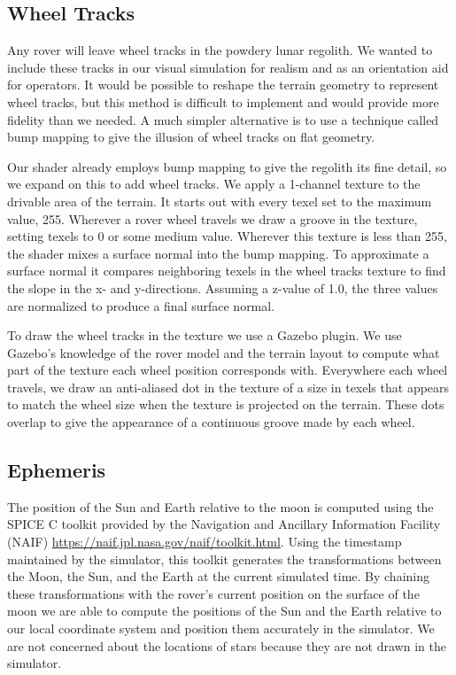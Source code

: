 \documentclass[twocolumn,letterpaper]{IEEEAerospaceCLS}  %
\begin{document}
\subsection{Wheel Tracks}
Any rover will leave wheel tracks in the powdery lunar regolith. We wanted to include these tracks in our visual simulation for realism and as an orientation aid for operators. It would be possible to reshape the terrain geometry to represent wheel tracks, but this method is difficult to implement and would provide more fidelity than we needed. A much simpler alternative is to use a technique called bump mapping to give the illusion of wheel tracks on flat geometry.

Our shader already employs bump mapping to give the regolith its fine detail, so we expand on this to add wheel tracks. We apply a 1-channel texture to the drivable area of the terrain. It starts out with every texel set to the maximum value, 255. Wherever a rover wheel travels we draw a groove in the texture, setting texels to 0 or some medium value. Wherever this texture is less than 255, the shader mixes a surface normal into the bump mapping. To approximate a surface normal it compares neighboring texels in the wheel tracks texture to find the slope in the x- and y-directions. Assuming a z-value of 1.0, the three values are normalized to produce a final surface normal.

To draw the wheel tracks in the texture we use a Gazebo plugin. We use Gazebo's knowledge of the rover model and the terrain layout to compute what part of the texture each wheel position corresponds with. Everywhere each wheel travels, we draw an anti-aliased dot in the texture of a size in texels that appears to match the wheel size when the texture is projected on the terrain. These dots overlap to give the appearance of a continuous groove made by each wheel.

\subsection{Ephemeris}

The position of the Sun and Earth relative to the moon is computed using the SPICE C toolkit provided by the Navigation and Ancillary Information Facility (NAIF) \url{https://naif.jpl.nasa.gov/naif/toolkit.html}.  Using the timestamp maintained by the simulator, this toolkit generates the transformations between the Moon, the Sun, and the Earth at the current simulated time.  By chaining these transformations with the rover's current position on the surface of the moon we are able to compute the positions of the Sun and the Earth relative to our local coordinate system and position them accurately in the simulator.  We are not concerned about the locations of stars because they are not drawn in the simulator.
\end{document}
